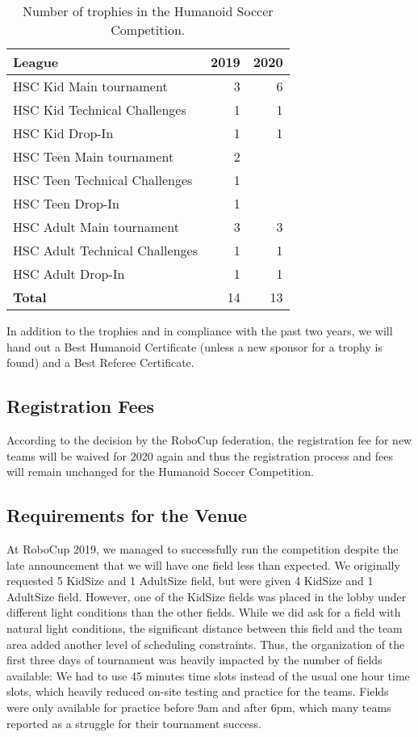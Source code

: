 \documentclass{article}
\begin{document}
\begin{table}[h]
  \centering
  \begin{tabular}{l | r | r}
    League & 2019 & 2020\\
    \hline
    HSC Kid Main tournament & 3 & 6\\ 
    HSC Kid Technical Challenges & 1 & 1\\
    HSC Kid Drop-In & 1 & 1\\
    HSC Teen Main tournament & 2 & \\ 
    HSC Teen Technical Challenges & 1 & \\
    HSC Teen Drop-In & 1 & \\
    HSC Adult Main tournament & 3 & 3\\ 
    HSC Adult Technical Challenges & 1 & 1\\
    HSC Adult Drop-In & 1 & 1\\
    \hline
    \textbf{Total} & 14 & 13
  \end{tabular}
  \caption{Number of trophies in the Humanoid Soccer Competition.}

\end{table}

In addition to the trophies and in compliance with the past two years, we will hand out a Best Humanoid Certificate (unless a new sponsor for a trophy is found) and a Best Referee Certificate.

\subsection{Registration Fees}
According to the decision by the RoboCup federation, the registration fee for new teams will be waived for 2020 again and thus the registration process and fees will remain unchanged for the Humanoid Soccer Competition.

\subsection{Requirements for the Venue}

At RoboCup 2019, we managed to successfully run the competition despite the late
announcement that we will have one field less than expected. We originally requested 5 KidSize and 1 AdultSize field, but were given 4 KidSize and 1 AdultSize field. However, one of the KidSize fields was placed in the lobby under different light conditions than the other fields. While we did ask for a field with natural light conditions, the significant distance between this field and the team area added another level of scheduling constraints. Thus, the organization of the first three days of tournament was heavily impacted by the number of fields available: We had to use 45 minutes time slots instead of the usual one hour time slots, which heavily reduced on-site testing and practice for the teams. Fields were only available for practice before 9am and after 6pm, which many teams reported as a struggle for their tournament success. 
\end{document}
